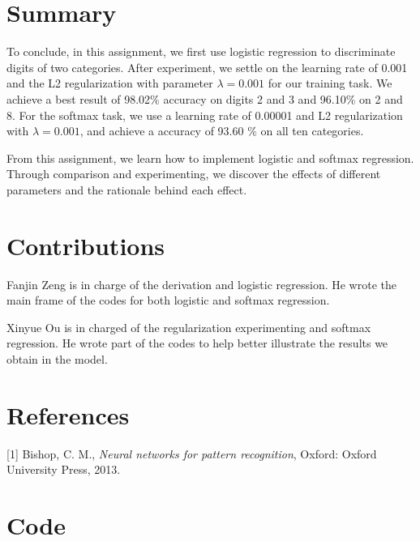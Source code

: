 \documentclass{article}
\begin{document}
\newpage
\section{Summary}
To conclude, in this assignment, we first use logistic regression to discriminate digits of two categories. After experiment, we settle on the learning rate of 0.001 and the L2 regularization with parameter $\lambda = 0.001$ for our training task. We achieve a best result of 98.02\% accuracy on digits 2 and 3 and 96.10\% on 2 and 8. For the softmax task, we use a learning rate of 0.00001 and L2 regularization with  $\lambda = 0.001$, and achieve a accuracy of 93.60 \% on all ten categories.

From this assignment, we learn how to implement logistic and softmax regression. Through comparison and experimenting, we discover the effects of different parameters and the rationale behind each effect. 
\section{Contributions}
Fanjin Zeng is in charge of the derivation and logistic regression. He wrote the main frame of the codes for both logistic and softmax regression. 

Xinyue Ou is in charged of the regularization experimenting and softmax regression. He wrote part of the codes to help better illustrate the results we obtain in the model.


\section{References}
[1] Bishop, C. M., {\it Neural networks for pattern recognition}, Oxford: Oxford University Press, 2013.

\newpage
\section{Code}
\end{document}
